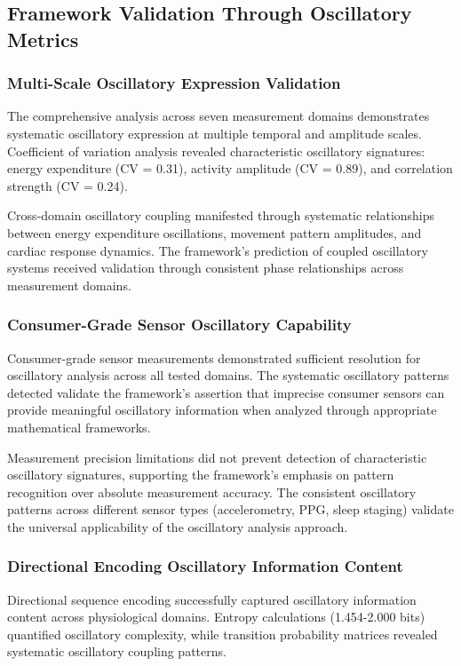 \documentclass[12pt,a4paper]{article}
\theoremstyle{definition}
\begin{document}
\subsection{Framework Validation Through Oscillatory Metrics}

\subsubsection{Multi-Scale Oscillatory Expression Validation}

The comprehensive analysis across seven measurement domains demonstrates systematic oscillatory expression at multiple temporal and amplitude scales. Coefficient of variation analysis revealed characteristic oscillatory signatures: energy expenditure (CV = 0.31), activity amplitude (CV = 0.89), and correlation strength (CV = 0.24).

Cross-domain oscillatory coupling manifested through systematic relationships between energy expenditure oscillations, movement pattern amplitudes, and cardiac response dynamics. The framework's prediction of coupled oscillatory systems received validation through consistent phase relationships across measurement domains.

\subsubsection{Consumer-Grade Sensor Oscillatory Capability}

Consumer-grade sensor measurements demonstrated sufficient resolution for oscillatory analysis across all tested domains. The systematic oscillatory patterns detected validate the framework's assertion that imprecise consumer sensors can provide meaningful oscillatory information when analyzed through appropriate mathematical frameworks.

Measurement precision limitations did not prevent detection of characteristic oscillatory signatures, supporting the framework's emphasis on pattern recognition over absolute measurement accuracy. The consistent oscillatory patterns across different sensor types (accelerometry, PPG, sleep staging) validate the universal applicability of the oscillatory analysis approach.

\subsubsection{Directional Encoding Oscillatory Information Content}

Directional sequence encoding successfully captured oscillatory information content across physiological domains. Entropy calculations (1.454-2.000 bits) quantified oscillatory complexity, while transition probability matrices revealed systematic oscillatory coupling patterns.
\end{document}
